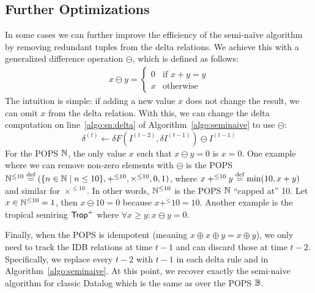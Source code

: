 \subsection{Further Optimizations}
\label{sec:redundant}
In some cases we can further improve the efficiency of the semi-na\"ive algorithm
 by removing redundant tuples from the delta relations.
We achieve this with a generalized difference operation $\ominus$,
 which is defined as follows:
%
\begin{align*}
  x \ominus y = \begin{cases}
    0 & \text{if } x + y = y \\
    x & \text{otherwise}
  \end{cases}
\end{align*}
%
The intuition is simple: if adding a new value $x$ does not change the result, 
 we can omit $x$ from the delta relation.
With this, we can change the delta computation
 on line~\ref{algo:sn:delta}
 of Algorithm~\ref{algo:seminaive} 
 to use $\ominus$:
%
$$\delta^{(t)} \gets \delta F(I^{(t-2)}, \delta I^{(t-1)}) \ominus I^{(t-1)}$$
%
For the POPS $\mathbb N$, the only value $x$ such that $x \ominus y = 0$ is $x = 0$. 
One example where we can remove non-zero elements with $\ominus$ 
 is the POPS ${\mathbb N}^{\leq 10} \stackrel{\text{def}}{=} (\{{n \in \mathbb N}\mid{n \leq 10}\}, +^{\leq 10}, \times^{\leq 10}, 0, 1)$, 
 where $x +^{\leq 10}y \stackrel{\text{def}}{=} \min(10, x + y)$ and similar for $\times^{\leq 10}$.
In other words, $\mathbb N^{\leq 10}$ is the POPS $\mathbb N$ ``capped at'' 10.
Let $x \in \mathbb N^{\leq 10} = 1$, then $x \ominus 10 = 0$ because $x +^{\leq} 10 = 10$.
Another example is the tropical semiring $\text{\sf Trop}^+$
 where $\forall x \geq y : x \ominus y = 0$.

Finally, when the POPS is idempotent (meaning $x \oplus x \oplus y = x \oplus y$),
 we only need to track the IDB relations at time $t-1$
 and can discard those at time $t-2$.
Specifically, we replace every $t-2$ with $t-1$
 in each delta rule and in Algorithm~\ref{algo:seminaive}.
At this point, we recover exactly the semi-na\"ive algorithm for classic Datalog
 which is the same as \datalogo over the POPS $\mathbb B$.

